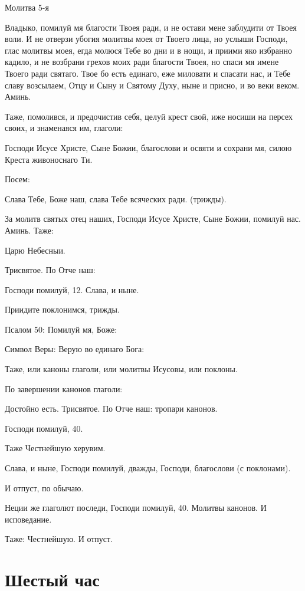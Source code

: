 Молитва 5-я

Владыко, помилуй мя благости Твоея ради, и не остави мене заблудити от Твоея воли. И не отверзи убогия молитвы моея от Твоего лица, но услыши Господи, глас молитвы моея, егда молюся Тебе во дни и в нощи, и приими яко избранно кадило, и не возбрани грехов моих ради благости Твоея, но спаси мя имене Твоего ради святаго. Твое бо есть единаго, еже миловати и спасати нас, и Тебе славу возсылаем, Отцу и Сыну и Святому Духу, ныне и присно, и во веки веком. Аминь.


Таже, помолився, и предочистив себя, целуй крест свой, иже носиши на персех своих, и знаменаяся им, глаголи:

Господи Исусе Христе, Сыне Божии, благослови и освяти и сохрани мя, силою Креста живоноснаго Ти.

Посем:

Слава Тебе, Боже наш, слава Тебе всяческих ради. (трижды).

За молитв святых отец наших, Господи Исусе Христе, Сыне Божии, помилуй нас. Аминь. Таже:

Царю Небесныи.

Трисвятое. По Отче наш:

Господи помилуй, 12. Слава, и ныне.

Приидите поклонимся, трижды.

Псалом 50: Помилуй мя, Боже:

Символ Веры: Верую во единаго Бога:

Таже, или каноны глаголи, или молитвы Исусовы, или поклоны.

По завершении канонов глаголи:

Достойно есть. Трисвятое. По Отче наш: тропари канонов.

Господи помилуй, 40.

Таже Честнейшую херувим.

Слава, и ныне, Господи помилуй, дважды, Господи, благослови (с поклонами).

И отпуст, по обычаю.

Неции же глаголют последи, Господи помилуй, 40. Молитвы канонов. И исповедание.

Таже: Честнейшую. И отпуст.


\mychapterending


 

\section{Шестый час}
 


